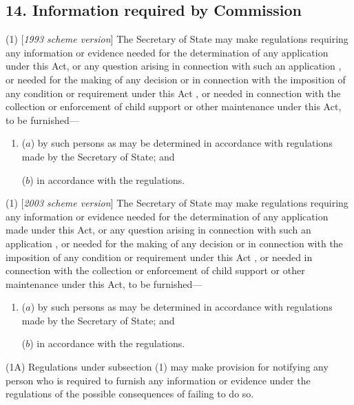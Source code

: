 \documentclass[12pt,a4paper]{article}
\begin{document}
\subsection{14. Information required by 
Commission  %
}

(1) [\emph{1993 scheme version}] The Secretary of State may make regulations requiring any information or evidence needed for the determination of any application under this Act, or any question arising in connection with such an application%
, or needed for the making of any decision or in connection with the imposition of any condition or requirement under this Act%
, or needed in connection with the collection or enforcement of child support or other maintenance under this Act, to be furnished—
\begin{enumerate}\item[]
($a$) by such persons as may be determined in accordance with regulations made by the Secretary of State; and

($b$) in accordance with the regulations.
\end{enumerate}

(1) [\emph{2003 scheme version}] The Secretary of State may make regulations requiring any information or evidence needed for the determination of any application 
made 
under this Act, or any question arising in connection with such an application%
, or needed for the making of any decision or in connection with the imposition of any condition or requirement under this Act%
, or needed in connection with the collection or enforcement of child support or other maintenance under this Act, to be furnished—
\begin{enumerate}\item[]
($a$) by such persons as may be determined in accordance with regulations made by the Secretary of State; and

($b$) in accordance with the regulations.
\end{enumerate}

(1A) Regulations under subsection (1) may make provision for notifying any person who is required to furnish any information or evidence under the regulations of the possible consequences of failing to do so.
\end{document}
